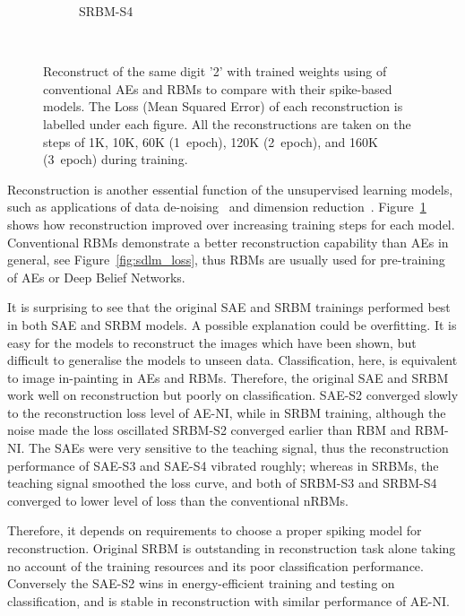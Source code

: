 \begin{figure}
\begin{subfigure}[t]{0.32\textwidth}
		\caption{SRBM-S4}
	\end{subfigure}\\
	\caption{Reconstruct of the same digit '2' with trained weights using of conventional AEs and RBMs to compare with their spike-based models.
		The Loss (Mean Squared Error) of each reconstruction is labelled under each figure.
		All the reconstructions are taken on the steps of 1K, 10K, 60K (1~epoch), 120K (2~epoch), and 160K (3~epoch) during training.}
	\label{fig:sdlm_recon}
\end{figure}

Reconstruction is another essential function of the unsupervised learning models, such as applications of data de-noising~\cite{xie2012image} and dimension reduction~\cite{hinton2006fast}.
Figure~\ref{fig:sdlm_recon} shows how reconstruction improved over increasing training steps for each model.
Conventional RBMs demonstrate a better reconstruction capability than AEs in general, see Figure~\ref{fig:sdlm_loss}, thus RBMs are usually used for pre-training of AEs or Deep Belief Networks.

It is surprising to see that the original SAE and SRBM trainings performed best in both SAE and SRBM models.
A possible explanation could be overfitting.
It is easy for the models to reconstruct the images which have been shown, but difficult to generalise the models to unseen data.
Classification, here, is equivalent to image in-painting in AEs and RBMs.
Therefore, the original SAE and SRBM work well on reconstruction but poorly on classification.
SAE-S2 converged slowly to the reconstruction loss level of AE-NI, while in SRBM training, although the noise made the loss oscillated SRBM-S2 converged earlier than RBM and RBM-NI.
The SAEs were very sensitive to the teaching signal, thus the reconstruction performance of SAE-S3 and SAE-S4 vibrated roughly; 
whereas in SRBMs, the teaching signal smoothed the loss curve, and both of SRBM-S3 and SRBM-S4 converged to lower level of loss than the conventional nRBMs.

Therefore, it depends on requirements to choose a proper spiking model for reconstruction.
Original SRBM is outstanding in reconstruction task alone taking no account of the training resources and its poor classification performance.
Conversely the SAE-S2 wins in energy-efficient training and testing on classification, and is stable in reconstruction with similar performance of AE-NI.

